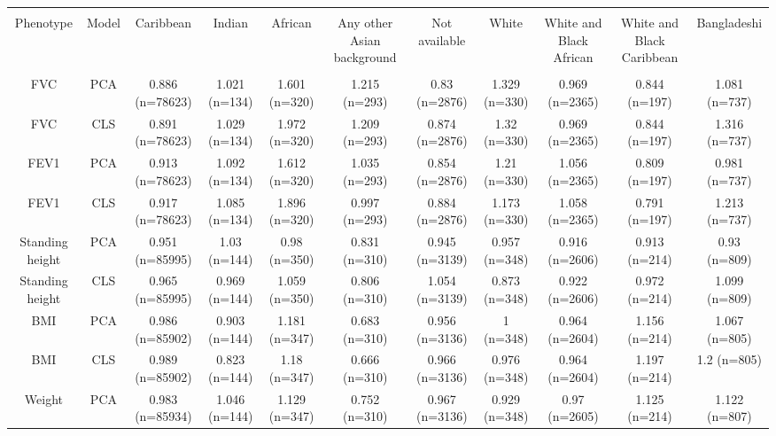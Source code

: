 \begin{landscape}

\begin{table}[!htbp] \centering 
\tiny 
\begin{tabular}{ ccccccccccc} 
\\[-1.8ex]\hline 
\hline \\[-1.8ex] 
Phenotype & Model & Caribbean & Indian & African & Any other Asian background & Not available & White & White and Black African & White and Black Caribbean & Bangladeshi \\ 
\hline \\[-1.8ex] 
FVC & PCA & 0.886 (n=78623) & 1.021 (n=134) & 1.601 (n=320) & 1.215 (n=293) & 0.83 (n=2876) & 1.329 (n=330) & 0.969 (n=2365) & 0.844 (n=197) & 1.081 (n=737) \\ 
FVC & CLS & 0.891 (n=78623) & 1.029 (n=134) & 1.972 (n=320) & 1.209 (n=293) & 0.874 (n=2876) & 1.32 (n=330) & 0.969 (n=2365) & 0.844 (n=197) & 1.316 (n=737) \\ 
FEV1 & PCA & 0.913 (n=78623) & 1.092 (n=134) & 1.612 (n=320) & 1.035 (n=293) & 0.854 (n=2876) & 1.21 (n=330) & 1.056 (n=2365) & 0.809 (n=197) & 0.981 (n=737) \\ 
FEV1 & CLS & 0.917 (n=78623) & 1.085 (n=134) & 1.896 (n=320) & 0.997 (n=293) & 0.884 (n=2876) & 1.173 (n=330) & 1.058 (n=2365) & 0.791 (n=197) & 1.213 (n=737) \\ 
Standing height & PCA & 0.951 (n=85995) & 1.03 (n=144) & 0.98 (n=350) & 0.831 (n=310) & 0.945 (n=3139) & 0.957 (n=348) & 0.916 (n=2606) & 0.913 (n=214) & 0.93 (n=809) \\ 
Standing height & CLS & 0.965 (n=85995) & 0.969 (n=144) & 1.059 (n=350) & 0.806 (n=310) & 1.054 (n=3139) & 0.873 (n=348) & 0.922 (n=2606) & 0.972 (n=214) & 1.099 (n=809) \\ 
BMI & PCA & 0.986 (n=85902) & 0.903 (n=144) & 1.181 (n=347) & 0.683 (n=310) & 0.956 (n=3136) & 1 (n=348) & 0.964 (n=2604) & 1.156 (n=214) & 1.067 (n=805) \\ 
BMI & CLS & 0.989 (n=85902) & 0.823 (n=144) & 1.18 (n=347) & 0.666 (n=310) & 0.966 (n=3136) & 0.976 (n=348) & 0.964 (n=2604) & 1.197 (n=214) & 1.2 (n=805) \\ 
Weight & PCA & 0.983 (n=85934) & 1.046 (n=144) & 1.129 (n=347) & 0.752 (n=310) & 0.967 (n=3136) & 0.929 (n=348) & 0.97 (n=2605) & 1.125 (n=214) & 1.122 (n=807) \\ 

\end{tabular}
\end{table}
\end{landscape}
